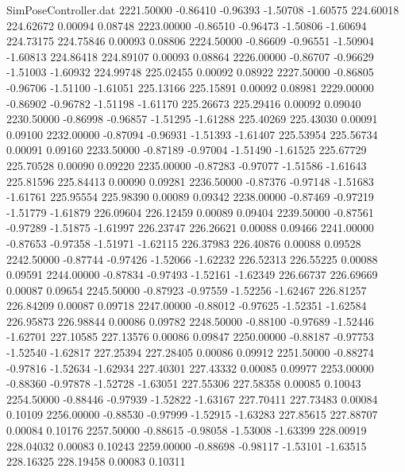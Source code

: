 \begin{filecontents}{SimPoseController.dat}
2221.50000   -0.86410   -0.96393    -1.50708   -1.60575  224.60018  224.62672    0.00094    0.08748
2223.00000   -0.86510   -0.96473    -1.50806   -1.60694  224.73175  224.75846    0.00093    0.08806
2224.50000   -0.86609   -0.96551    -1.50904   -1.60813  224.86418  224.89107    0.00093    0.08864
2226.00000   -0.86707   -0.96629    -1.51003   -1.60932  224.99748  225.02455    0.00092    0.08922
2227.50000   -0.86805   -0.96706    -1.51100   -1.61051  225.13166  225.15891    0.00092    0.08981
2229.00000   -0.86902   -0.96782    -1.51198   -1.61170  225.26673  225.29416    0.00092    0.09040
2230.50000   -0.86998   -0.96857    -1.51295   -1.61288  225.40269  225.43030    0.00091    0.09100
2232.00000   -0.87094   -0.96931    -1.51393   -1.61407  225.53954  225.56734    0.00091    0.09160
2233.50000   -0.87189   -0.97004    -1.51490   -1.61525  225.67729  225.70528    0.00090    0.09220
2235.00000   -0.87283   -0.97077    -1.51586   -1.61643  225.81596  225.84413    0.00090    0.09281
2236.50000   -0.87376   -0.97148    -1.51683   -1.61761  225.95554  225.98390    0.00089    0.09342
2238.00000   -0.87469   -0.97219    -1.51779   -1.61879  226.09604  226.12459    0.00089    0.09404
2239.50000   -0.87561   -0.97289    -1.51875   -1.61997  226.23747  226.26621    0.00088    0.09466
2241.00000   -0.87653   -0.97358    -1.51971   -1.62115  226.37983  226.40876    0.00088    0.09528
2242.50000   -0.87744   -0.97426    -1.52066   -1.62232  226.52313  226.55225    0.00088    0.09591
2244.00000   -0.87834   -0.97493    -1.52161   -1.62349  226.66737  226.69669    0.00087    0.09654
2245.50000   -0.87923   -0.97559    -1.52256   -1.62467  226.81257  226.84209    0.00087    0.09718
2247.00000   -0.88012   -0.97625    -1.52351   -1.62584  226.95873  226.98844    0.00086    0.09782
2248.50000   -0.88100   -0.97689    -1.52446   -1.62701  227.10585  227.13576    0.00086    0.09847
2250.00000   -0.88187   -0.97753    -1.52540   -1.62817  227.25394  227.28405    0.00086    0.09912
2251.50000   -0.88274   -0.97816    -1.52634   -1.62934  227.40301  227.43332    0.00085    0.09977
2253.00000   -0.88360   -0.97878    -1.52728   -1.63051  227.55306  227.58358    0.00085    0.10043
2254.50000   -0.88446   -0.97939    -1.52822   -1.63167  227.70411  227.73483    0.00084    0.10109
2256.00000   -0.88530   -0.97999    -1.52915   -1.63283  227.85615  227.88707    0.00084    0.10176
2257.50000   -0.88615   -0.98058    -1.53008   -1.63399  228.00919  228.04032    0.00083    0.10243
2259.00000   -0.88698   -0.98117    -1.53101   -1.63515  228.16325  228.19458    0.00083    0.10311

\end{filecontents}
